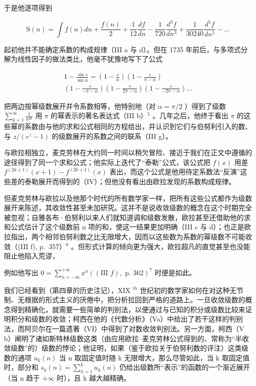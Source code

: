 于是他逐项得到

\[
\mathrm{S} (n) = \int f (n) d n + \frac {f (n)}{2} + \frac {1}{1 2} \frac {d f}{d n} - \frac {1}{7 2 0} \frac {d ^ {3} f}{d n ^ {3}} + \frac {1}{3 0 2 4 0} \frac {d ^ {5} f}{d n ^ {5}} - \dots
\]

起初他并不能确定系数的构成规律（III a 与 d）。但在 1735 年前后，与多项式分解为线性因子的做法类比，他毫不犹豫地写下了公式

\[
\begin{array}{c} 1 - \frac {\sin s}{\sin \alpha} = \left(1 - \frac {s}{\alpha}\right) \left(1 - \frac {s}{\pi - \alpha}\right) \\ \left(1 - \frac {s}{- \pi - \alpha}\right) \left(1 - \frac {s}{2 \pi - \alpha}\right) \left(1 - \frac {s}{- 2 \pi - \alpha}\right) \dots \end{array}
\]

把两边按幂级数展开并令系数相等，他特别地（对 \(\alpha = \pi/2\) ）得到了级数 \(\sum_{k=1}^{\infty} \frac{1}{n^{2k}}\) 用 \(\pi\) 的幂表示的著名表达式（III b）\(^{5}\) 。几年之后，他终于看出 \(\pi\) 的这些幂的系数由与他的求和公式相同的方程给出，并认识到它们与伯努利引入的数、与 \(z/(e^{z} - 1)\) 的级数展开的系数之间的联系（III g）。

与欧拉相独立，麦克劳林在大约同一时间以稍欠冒险、接近于我们在正文中遵循的途径得到了同一个求和公式；他实际上迭代了“泰勒”公式，该公式把 \(f(x)\) 用差 \(f^{(2k+1)}(x+1)-f^{(2k+1)}(x)\) 表出，而这个公式是他用待定系数法“反演”这些差的泰勒展开而得到的（IV）；但他没有看出由欧拉发现的系数构成规律。

但麦克劳林与欧拉以及他那个时代的所有数学家一样，把所有这些公式都作为级数展开来陈述，其收敛性甚至未加研究。这并不是说收敛级数的概念在这个时期完全被忽视；自雅各布·伯努利以来人们就知道调和级数发散，欧拉甚至还借助他的求和公式估计了这个级数前 n 项的和，使这一结果更加明确（III c 与 d）；也正是欧拉指出，两个相邻伯努利数之比无限增大，因而以这些数为系数的幂级数不可能收敛（(III f), p.~357）\(^{6}\) 。但形式计算的倾向更为强大，欧拉超凡的直觉甚至也没能阻止他陷入荒谬，

例如他写出 \(0 = \sum_{n=-\infty}^{+\infty} x^n ((\text{III } f), \text{ p. 362})^7\) 时便是如此。

我们已经看到（第四章的历史注记），XIX \(^{th}\) 世纪初的数学家如何在对这种无节制、无根据的形式主义的厌倦中，把分析拉回到严格的道路上。一旦收敛级数的概念得到精确化，就需要一些简单的判别法，以便通过与已知的积分或级数比较来证明积分和级数的收敛；柯西在他的《代数分析》（Va）中给出了若干这样的判别法，而阿贝尔在一篇遗著（VI）中得到了对数收敛判别法。另一方面，柯西（V b）阐明了诸如斯特林级数这类（由应用欧拉–麦克劳林公式得到的、常称为“半收敛级数”的）级数的悖论；他证明，如果（鉴于欧拉关于伯努利数的评注）这类级数的通项 \(u_{k}(n)\) 当 n 取固定值时随 k 无限增大，那么尽管如此，当 k 取固定值时，部分和 \(s_{k}(n) = \sum_{h=1}^{k} u_{h}(n)\) 仍给出级数所“表示”的函数的一个渐近展开（当 n 趋于 \(+\infty\) 时），且 k 越大越精确。

